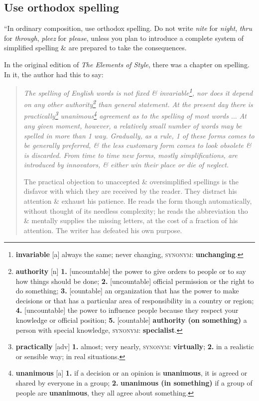 \documentclass[oneside]{book}
\numberwithin{equation}{section}
\begin{document}
\subsection{Use orthodox spelling}
``In ordinary composition, use orthodox spelling. Do not write \textit{nite} for \textit{night}, \textit{thru} for \textit{through}, \textit{pleez} for \textit{please}, unless you plan to introduce a complete system of simplified spelling \& are prepared to take the consequences.

In the original edition of \textit{The Elements of Style}, there was a chapter on spelling. In it, the author had this to say:

\begin{quotation}\it
	The spelling of English words is not fixed \& invariable\footnote{\textbf{invariable} [a] always the same; never changing, \textsc{synonym}: \textbf{unchanging}.}, nor does it depend on any other authority\footnote{\textbf{authority} [n] \textbf{1.} [uncountable] the power to give orders to people or to say how things should be done; \textbf{2.} [uncountable] official permission or the right to do something; \textbf{3.} [countable] an organization that has the power to make decisions or that has a particular area of responsibility in a country or region; \textbf{4.} [uncountable] the power to influence people because they respect your knowledge or official position; \textbf{5.} [countable] \textbf{authority (on something)} a person with special knowledge, \textsc{synonym}: \textbf{specialist}.} than general statement. At the present day there is practically\footnote{\textbf{practically} [adv] \textbf{1.} almost; very nearly, \textsc{synonym}: \textbf{virtually}; \textbf{2.} in a realistic or sensible way; in real situations.} unanimous\footnote{\textbf{unanimous} [a] \textbf{1.} if a decision or an opinion is \textbf{unanimous}, it is agreed or shared by everyone in a group; \textbf{2.} \textbf{unanimous (in something)} if a group of people are \textbf{unanimous}, they all agree about something.} agreement as to the spelling of most words $\ldots$ At any given moment, however, a relatively small number of words may be spelled in more than 1 way. Gradually, as a rule, 1 of these forms comes to be generally preferred, \& the less customary form comes to look obsolete \& is discarded. From time to time new forms, mostly simplifications, are introduced by innovators, \& either win their place or die of neglect.
	
	The practical objection to unaccepted \& oversimplified spellings is the disfavor with which they are received by the reader. They distract his attention \& exhaust his patience. He reads the form though automatically, without thought of its needless complexity; he reads the abbreviation tho \& mentally supplies the missing letters, at the cost of a fraction of his attention. The writer has defeated his own purpose.
\end{quotation}
\end{document}
